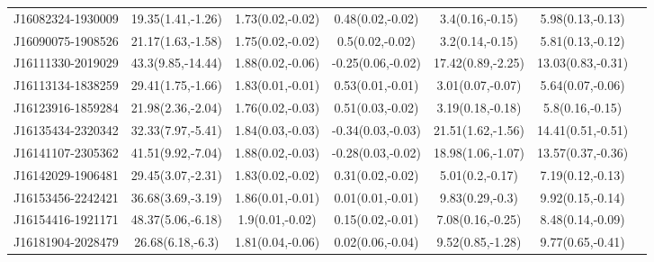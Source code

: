 \begin{longtable}{lcccccc}
J16082324-1930009 & 19.35(1.41,-1.26) & 1.73(0.02,-0.02) &  0.48(0.02,-0.02) &   3.4(0.16,-0.15) &  5.98(0.13,-0.13) \\
J16090075-1908526 & 21.17(1.63,-1.58) & 1.75(0.02,-0.02) &   0.5(0.02,-0.02) &   3.2(0.14,-0.15) &  5.81(0.13,-0.12) \\
J16111330-2019029 & 43.3(9.85,-14.44) & 1.88(0.02,-0.06) & -0.25(0.06,-0.02) & 17.42(0.89,-2.25) & 13.03(0.83,-0.31) \\
J16113134-1838259 & 29.41(1.75,-1.66) & 1.83(0.01,-0.01) &  0.53(0.01,-0.01) &  3.01(0.07,-0.07) &  5.64(0.07,-0.06) \\
J16123916-1859284 & 21.98(2.36,-2.04) & 1.76(0.02,-0.03) &  0.51(0.03,-0.02) &  3.19(0.18,-0.18) &   5.8(0.16,-0.15) \\
J16135434-2320342 & 32.33(7.97,-5.41) & 1.84(0.03,-0.03) & -0.34(0.03,-0.03) & 21.51(1.62,-1.56) & 14.41(0.51,-0.51) \\
J16141107-2305362 & 41.51(9.92,-7.04) & 1.88(0.02,-0.03) & -0.28(0.03,-0.02) & 18.98(1.06,-1.07) & 13.57(0.37,-0.36) \\
J16142029-1906481 & 29.45(3.07,-2.31) & 1.83(0.02,-0.02) &  0.31(0.02,-0.02) &   5.01(0.2,-0.17) &  7.19(0.12,-0.13) \\
J16153456-2242421 & 36.68(3.69,-3.19) & 1.86(0.01,-0.01) &  0.01(0.01,-0.01) &   9.83(0.29,-0.3) &  9.92(0.15,-0.14) \\
J16154416-1921171 & 48.37(5.06,-6.18) &  1.9(0.01,-0.02) &  0.15(0.02,-0.01) &  7.08(0.16,-0.25) &  8.48(0.14,-0.09) \\
J16181904-2028479 &  26.68(6.18,-6.3) & 1.81(0.04,-0.06) &  0.02(0.06,-0.04) &  9.52(0.85,-1.28) &  9.77(0.65,-0.41) \\
\end{longtable}
